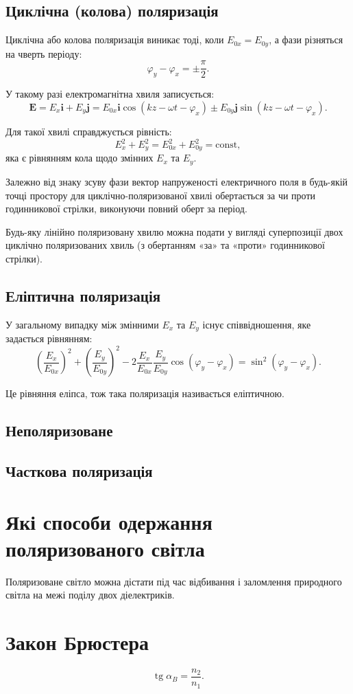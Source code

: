 \documentclass[a4paper,oneside,DIV=10,12pt]{scrartcl}
\begin{document}
		\subsection{Циклічна (колова) поляризація}
			Циклічна або колова поляризація виникає тоді, коли $E_{0x}=E_{0y}$, а фази різняться на чверть періоду:
			\[
				\varphi _{y}-\varphi _{x}=\pm {\frac {\pi }{2}}.
			\]
			
			У такому разі електромагнітна хвиля записується:
			\[
				\mathbf {E} =E_{x}\mathbf {i} +E_{y}\mathbf {j} =E_{0x}\mathbf {i} \cos(kz-\omega t-\varphi _{x})\pm E_{0y}\mathbf {j} \sin(kz-\omega t-\varphi _{x}).
			\]
			
			Для такої хвилі справджується рівність:
			\[
				\displaystyle E_{x}^{2}+E_{y}^{2}=E_{0x}^{2}+E_{0y}^{2}={\text{const}},
			\]
			яка є рівнянням кола щодо змінних $E_{x}$ та $E_{y}$.
			
			Залежно від знаку зсуву фази вектор напруженості електричного поля в будь-якій точці простору для циклічно-поляризованої хвилі обертається за чи проти годинникової стрілки, виконуючи повний оберт за період.
			
			Будь-яку лінійно поляризовану хвилю можна подати у вигляді суперпозиції двох циклічно поляризованих хвиль (з обертанням «за» та «проти» годинникової стрілки).
			
		\subsection{Еліптична поляризація}
			У загальному випадку між змінними $E_{x}$ та $E_{y}$ існує співвідношення, яке задається рівнянням:
			\[
				\left({\frac {E_{x}}{E_{0x}}}\right)^{2}+\left({\frac {E_{y}}{E_{0y}}}\right)^{2}-2{\frac {E_{x}}{E_{0x}}}{\frac {E_{y}}{E_{0y}}}\cos(\varphi _{y}-\varphi _{x})=\sin ^{2}(\varphi _{y}-\varphi _{x}).
			\]
			
			Це рівняння еліпса, тож така поляризація називається еліптичною.
			
		\subsection{Неполяризоване}
		\subsection{Часткова поляризація}
		
	\section{Які способи одержання поляризованого світла}
		Поляризоване світло можна дістати під час відбивання і заломлення природного світла на межі поділу двох діелектриків.
	\section{Закон Брюстера}
		\[
			\operatorname{tg} \alpha_B = \frac{n_2}{n_1}.
		\]
\end{document}
